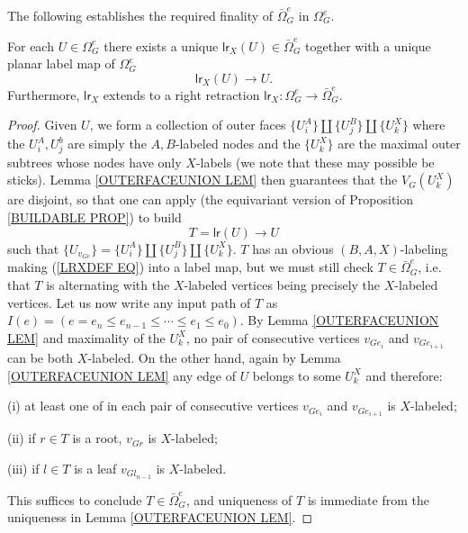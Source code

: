 \documentclass[a4paper,10pt]{article}%
\begin{document}
The following establishes the required finality of $\bar{\Omega}_G^e$ in $\Omega_G^e$.

\begin{proposition}\label{LXP PROP}
  For each $U \in \Omega_G^e$ there exists a unique 
  $\mathsf{lr}_X (U) \in \bar{\Omega}_G^e$ together with a unique planar label map of $\Omega_G^e$
  \[\mathsf{lr}_X (U) \to U.\]
  Furthermore, $\mathsf{lr}_X$ extends to a right retraction $\mathsf{lr}_X \colon \Omega_G^e \to \bar{\Omega}_G^e$.
\end{proposition}

\begin{proof}
  Given $U$, we form a collection of outer faces
  $\{U_i^A\} \amalg \{U_j^B\} \amalg \{U_k^X\}$
  where the $U_i^A, U_j^b$ are simply the $A,B$-labeled nodes
  and the $\{U_k^X\}$ are the maximal outer subtrees whose nodes have only $X$-labels (we note that these may possible be sticks). 
  Lemma \ref{OUTERFACEUNION LEM} then guarantees that the $V_G(U_k^{X})$ are disjoint, so that one can apply (the equivariant version of Proposition \ref{BUILDABLE PROP})
  to build 
  \begin{equation}\label{LRXDEF EQ}
    T = \mathsf{lr}(U) \to U
  \end{equation}
  such that $\{U_{v_{G e}}\} = \{U_i^A\} \amalg \{U_j^B\} \amalg \{U_k^X\}$. $T$ has an obvious $(B,A,X)$-labeling making 
  (\ref{LRXDEF EQ}) into a label map, but we must still check $T \in \bar{\Omega}^{e}_G$, i.e. that $T$ is alternating with the $X$-labeled vertices being precisely the $X$-labeled vertices.
  Let us now write any input path of $T$ as 
  $I(e) = (e = e_n \leq e_{n-1} \leq \cdots \leq e_1 \leq e_0)$.
  By Lemma \ref{OUTERFACEUNION LEM} and maximality of the $U_k^X$, no pair of consecutive vertices $v_{Ge_i}$ and $v_{Ge_{i+1}}$ can be both $X$-labeled.
  On the other hand, again by Lemma \ref{OUTERFACEUNION LEM} any edge of $U$ belongs to some $U^X_k$ and therefore:
  \begin{inparaenum}
  \item[(i)] at least one of in each pair of consecutive vertices $v_{Ge_i}$ and $v_{Ge_{i+1}}$ is $X$-labeled;
  \item[(ii)] if $r \in T$ is a root, $v_{G r}$ is $X$-labeled;
  \item[(iii)] if $l \in T$ is a leaf $v_{G l_{n-1}}$ is $X$-labeled.
  \end{inparaenum}
  This suffices to conclude $T \in \bar{\Omega}_{G}^e$, and
  uniqueness of $T$ is immediate from the uniqueness in Lemma \ref{OUTERFACEUNION LEM}. 



\end{proof}
\end{document}
